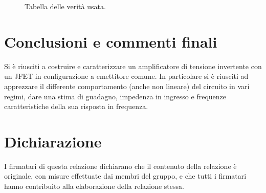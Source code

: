 \documentclass[10pt, a4paper, italian]{article}
\begin{document}
\begin{figure}[htbp]
    \centering
    \caption{Tabella delle verità usata.}
    \label{fig:Ver}
\end{figure}

\section*{Conclusioni e commenti finali}
Si è riusciti a costruire e caratterizzare un amplificatore di tensione
invertente con un JFET in configurazione a emettitore comune. In particolare
si è riusciti ad apprezzare il differente comportamento (anche non lineare)
del circuito in vari regimi, dare una stima di guadagno, impedenza in
ingresso e frequenze caratteristiche della sua risposta in frequenza.

\section*{Dichiarazione}
I firmatari di questa relazione dichiarano che il contenuto della relazione \`e
originale, con misure effettuate dai membri del gruppo, e che tutti i firmatari
hanno contribuito alla elaborazione della relazione stessa.
\end{document}
